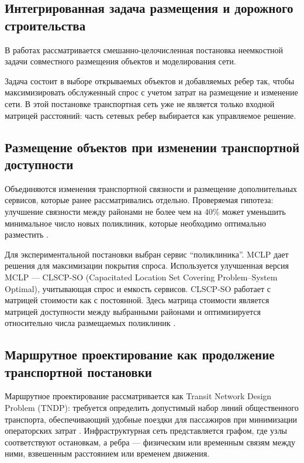 \documentclass[14pt,a4paper]{extarticle}
\begin{document}
\subsection*{Интегрированная задача размещения и дорожного строительства}

В работах \cite{daskin1993towardIntegrated,melkote1996integrated,melkote2001integrated} рассматривается смешанно-целочисленная постановка неемкостной задачи совместного размещения объектов и моделирования сети.

Задача состоит в выборе открываемых объектов и добавляемых ребер так, чтобы максимизировать обслуженный спрос с учетом затрат на размещение и изменение сети. В этой постановке транспортная сеть уже не является только входной матрицей расстояний: часть сетевых ребер выбирается как управляемое решение.

\subsection*{Размещение объектов при изменении транспортной доступности}

Объединяются изменения транспортной связности и размещение дополнительных сервисов, которые ранее рассматривались отдельно. Проверяемая гипотеза: улучшение связности между районами не более чем на 40\% может уменьшить минимальное число новых поликлиник, которые необходимо оптимально разместить \cite{kontsevik2024connectivityPlacement}.

Для экспериментальной постановки выбран сервис ``поликлиника''. MCLP дает решения для максимизации покрытия спроса. Используется улучшенная версия MCLP --- CLSCP-SO (Capacitated Location Set Covering Problem--System Optimal), учитывающая спрос и емкость сервисов. CLSCP-SO работает с матрицей стоимости как с постоянной. Здесь матрица стоимости является матрицей доступности между выбранными районами и оптимизируется относительно числа размещаемых поликлиник \cite{churchMurray2018,spoptLscpCapacity,kontsevik2024connectivityPlacement}.

\subsection*{Маршрутное проектирование как продолжение транспортной постановки}

Маршрутное проектирование рассматривается как Transit Network Design Problem (TNDP): требуется определить допустимый набор линий общественного транспорта, обеспечивающий удобные поездки для пассажиров при минимизации операторских затрат \cite{mandl1980tndp,duranMicco2022tndpReview,sahin2023linePlanning,morozov2026oneRuleTndp}. Инфраструктурная сеть представляется графом, где узлы соответствуют остановкам, а ребра --- физическим или временным связям между ними, взвешенным расстоянием или временем движения.
\end{document}
